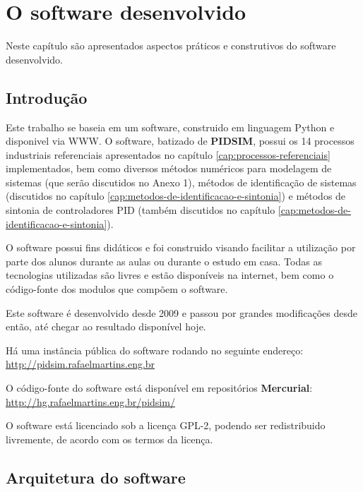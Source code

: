\chapter{O software desenvolvido \label{cap:software}}

Neste capítulo são apresentados aspectos práticos e construtivos do
software desenvolvido.

\section{Introdução}

    Este trabalho se baseia em um software, construido em linguagem Python
    e disponivel via \ac{WWW}. O software, batizado de \textbf{PIDSIM},
    possui os 14 processos industriais referenciais apresentados no capítulo
    \ref{cap:processos-referenciais} implementados, bem como diversos
    métodos numéricos para modelagem de sistemas (que serão discutidos no
    Anexo 1), métodos de identificação de sistemas (discutidos no capítulo
    \ref{cap:metodos-de-identificacao-e-sintonia}) e métodos de sintonia de
    controladores \acs{PID} (também discutidos no capítulo
    \ref{cap:metodos-de-identificacao-e-sintonia}).

    O software possui fins didáticos e foi construido visando facilitar a
    utilização por parte dos alunos durante as aulas ou durante o estudo em casa.
    Todas as tecnologias utilizadas são livres e estão disponíveis na internet,
    bem como o código-fonte dos modulos que compõem o software.

    Este software é desenvolvido desde 2009 e passou por grandes modificações
    desde então, até chegar ao resultado disponível hoje.

    Há uma instância pública do software rodando no seguinte endereço: \\
    \url{http://pidsim.rafaelmartins.eng.br}

    O código-fonte do software está disponível em repositórios \textbf{Mercurial}: \\
    \url{http://hg.rafaelmartins.eng.br/pidsim/}

    O software está licenciado sob a licença \ac{GPL-2}, podendo ser redistribuido
    livremente, de acordo com os termos da licença.

\section{Arquitetura do software}

